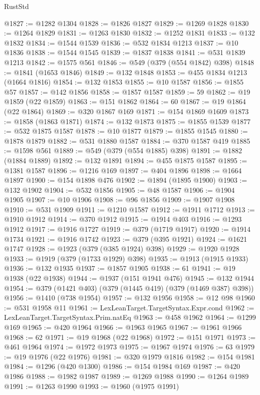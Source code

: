 \begin{lexlean}{RustStd}
\begin{coremodule}
@1827 := @1282 @1304
@1828 := @1826 @1827
@1829 := @1269 @1828
@1830 := @1264 @1829
@1831 := @1263 @1830
@1832 := @1252 @1831
@1833 := @132 @1832
@1834 := @1544 @1539
@1836 := @532 @1834 @1213
@1837 := @10 @1836
@1838 := @1544 @1545
@1839 := @1837 @1838
@1841 := @531 @1839 @1213
@1842 := @1575 @561
@1846 := @549 (@379 (@554 @1842) @398)
@1848 := @1841 (@1653 @1846)
@1849 := @132 @1848
@1853 := @455 @1834 @1213 (@1664 @1816)
@1854 := @132 @1853
@1855 := @10 @1587
@1856 := @1855 @57
@1857 := @142 @1856
@1858 := @1857 @1587
@1859 := 59
@1862 := @19 @1859 (@22 @1859)
@1863 := @151 @1862
@1864 := 60
@1867 := @19 @1864 (@22 @1864)
@1869 := @320 @1867 @169
@1871 := @154 @1869 @1609
@1873 := @1858 (@1863 @1871)
@1874 := @132 @1873
@1875 := @1855 @1539
@1877 := @532 @1875 @1587
@1878 := @10 @1877
@1879 := @1855 @1545
@1880 := @1878 @1879
@1882 := @531 @1880 @1587
@1884 := @370 @1587 @419
@1885 := @1598 @561
@1889 := @549 (@379 (@554 @1885) @398)
@1891 := @1882 (@1884 @1889)
@1892 := @132 @1891
@1894 := @455 @1875 @1587
@1895 := @1381 @1587
@1896 := @1216 @169
@1897 := @404 @1896
@1898 := @1664 @1897
@1900 := @154 @1898 @476
@1902 := @1894 (@1895 @1900)
@1903 := @132 @1902
@1904 := @532 @1856
@1905 := @48 @1587
@1906 := @1904 @1905
@1907 := @10 @1906
@1908 := @96 @1856
@1909 := @1907 @1908
@1910 := @531 @1909
@1911 := @1210 @1587
@1912 := @1911 @1712
@1913 := @1910 @1912
@1914 := @370 @1912
@1915 := @1914 @403
@1916 := @1293 @1912
@1917 := @1916 @1727
@1919 := @379 (@1719 @1917)
@1920 := @1914 @1734
@1921 := @1916 @1742
@1923 := @379 (@395 @1921)
@1924 := @1621 @1747
@1928 := @1923 (@379 (@385 @1924) @398)
@1929 := @1920 @1928
@1933 := @1919 (@379 (@1733 @1929) @398)
@1935 := @1913 (@1915 @1933)
@1936 := @132 @1935
@1937 := @1857 @1905
@1938 := 61
@1941 := @19 @1938 (@22 @1938)
@1944 := @1937 (@151 @1941 @476)
@1945 := @132 @1944
@1954 := @379 (@1421 @403) (@379 (@1445 @419) (@379 (@1469 @387) @398))
@1956 := @1410 (@738 @1954)
@1957 := @132 @1956
@1958 := @12 @98
@1960 := @531 @1958 @11
@1961 := LexLeanTarget.TargetSyntax.Expr.cond
@1962 := LexLeanTarget.TargetSyntax.Prim.natEq
@1963 := @458 @1962
@1964 := @1299 @169
@1965 := @420 @1964
@1966 := @1963 @1965
@1967 := @1961 @1966
@1968 := 62
@1971 := @19 @1968 (@22 @1968)
@1972 := @151 @1971
@1973 := @461 @1964
@1974 := @1972 @1973
@1975 := @1967 @1974
@1976 := 63
@1979 := @19 @1976 (@22 @1976)
@1981 := @320 @1979 @1816
@1982 := @154 @1981
@1984 := @1296 (@420 @1300)
@1986 := @154 @1984 @169
@1987 := @420 @1986
@1988 := @1982 @1987
@1989 := @1269 @1988
@1990 := @1264 @1989
@1991 := @1263 @1990
@1993 := @1960 (@1975 @1991)

\end{coremodule}
\end{lexlean}

